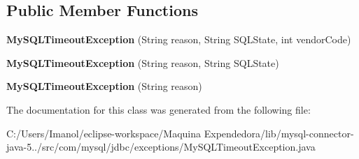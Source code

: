 \subsection*{Public Member Functions}
\begin{DoxyCompactItemize}
\item 
\mbox{\label{classcom_1_1mysql_1_1jdbc_1_1exceptions_1_1_my_s_q_l_timeout_exception_a7bf38a1504d5c16f1b557daab738c41c}} 
{\bfseries My\+S\+Q\+L\+Timeout\+Exception} (String reason, String S\+Q\+L\+State, int vendor\+Code)
\item 
\mbox{\label{classcom_1_1mysql_1_1jdbc_1_1exceptions_1_1_my_s_q_l_timeout_exception_a4d6f7c87cf7e4d55b9262957b9091178}} 
{\bfseries My\+S\+Q\+L\+Timeout\+Exception} (String reason, String S\+Q\+L\+State)
\item 
\mbox{\label{classcom_1_1mysql_1_1jdbc_1_1exceptions_1_1_my_s_q_l_timeout_exception_a6eb56e6f4491c1fa63b0df8ddbadcdd5}} 
{\bfseries My\+S\+Q\+L\+Timeout\+Exception} (String reason)
\end{DoxyCompactItemize}


The documentation for this class was generated from the following file\+:\begin{DoxyCompactItemize}
\item 
C\+:/\+Users/\+Imanol/eclipse-\/workspace/\+Maquina Expendedora/lib/mysql-\/connector-\/java-\/5../src/com/mysql/jdbc/exceptions/My\+S\+Q\+L\+Timeout\+Exception.\+java\end{DoxyCompactItemize}
